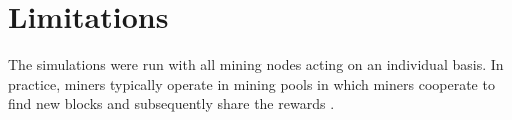\section{Limitations}

The simulations were run with all mining nodes acting on an individual basis. In practice, miners typically operate in mining pools in which miners cooperate to find new blocks and subsequently share the rewards \cite{Rosenfeld}.